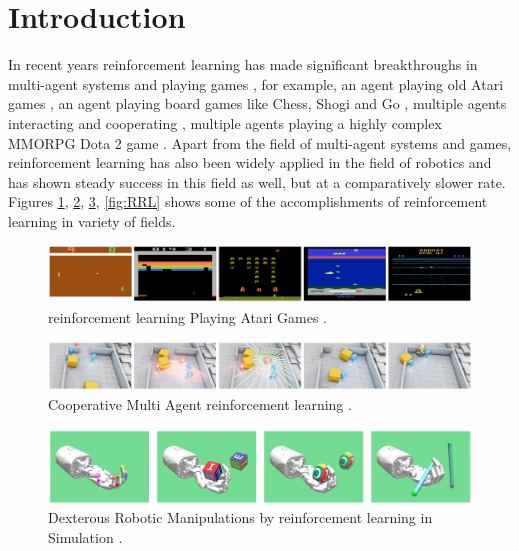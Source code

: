 \section{Introduction}

In recent years reinforcement learning has made significant breakthroughs in multi-agent systems \cite{oroojlooyjadid2021review} and playing games \cite{shao2019survey}, for example, an agent playing old Atari games \cite{mnih2013playing}, an agent playing board games like Chess, Shogi and Go \cite{silver2017mastering} \cite{alphago}, multiple agents interacting and cooperating \cite{baker2020emergent}, multiple agents playing a highly complex MMORPG Dota 2 game \cite{openai2019dota}. Apart from the field of multi-agent systems and games, reinforcement learning has also been widely applied in the field of robotics \cite{robotics2030122} \cite{RLRS} \cite{RLR} \cite{openai2019learning} \cite{zhu2020ingredients} and has shown steady success in this field as well, but at a comparatively slower rate. Figures \ref{fig:GRL}, \ref{fig:MARL}, \ref{fig:RRL1}, \ref{fig:RRL} shows some of the accomplishments of reinforcement learning in variety of fields. \\

\begin{figure}[h!]
    \centering
    \includegraphics[width=\textwidth]{images/GRL.png}
    \caption{reinforcement learning Playing Atari Games \cite{mnih2013playing}.}
    \label{fig:GRL}
\end{figure}

\begin{figure}[h!]
    \centering
    \includegraphics[width=\textwidth]{images/MARL.png}
    \caption{Cooperative Multi Agent reinforcement learning \cite{baker2020emergent}.}
    \label{fig:MARL}
\end{figure}

\begin{figure}[h!]
    \centering
    \includegraphics[width=\textwidth]{images/RRL1.png}
    \caption{Dexterous Robotic Manipulations by reinforcement learning in Simulation \cite{plappert2018multigoal}.}
    \label{fig:RRL1}
\end{figure}

